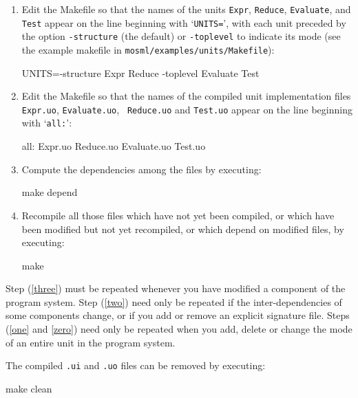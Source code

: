 \documentclass[fleqn,a4paper]{article}
\begin{document}
\begin{enumerate}
\item\label{zero} Edit the Makefile so that the names of the units
  {\tt Expr}, {\tt Reduce}, {\tt Evaluate},  and {\tt Test} appear on the line beginning
  with `{\tt UNITS=}', with each unit preceded by the option {\tt -structure} (the default) or
  {\tt -toplevel}
  to indicate its mode
  (see the example makefile in \texttt{mosml/examples/units/Makefile}):

\begin{program}
UNITS=-structure Expr Reduce -toplevel Evaluate Test
\end{program}

\item\label{one} Edit the Makefile so that the names of the compiled
  unit implementation files {\tt Expr.uo}, {\tt Evaluate.uo}, {\tt
    Reduce.uo} and {\tt Test.uo} appear on the line beginning with
  `{\tt all:}':

\begin{program}
all: Expr.uo Reduce.uo Evaluate.uo Test.uo
\end{program}

\item\label{two} Compute the dependencies among the files by executing:

\begin{program}
make depend
\end{program}

\item\label{three} Recompile all those files which have not yet been compiled, or
  which have been modified but not yet recompiled, or which depend on
  modified files, by executing:
        
\begin{program}
make    
\end{program}
\end{enumerate}

\noindent Step (\ref{three}) must be repeated whenever you have modified a
component of the program system.  Step (\ref{two}) need only be repeated if
the inter-dependencies of some components change, or if you add or
remove an explicit signature file.  Steps (\ref{one} and \ref{zero}) need only be repeated
when you add, delete or change the mode of an entire unit in the program system.

The compiled {\tt *.ui} and {\tt *.uo} files can be removed by executing:

\begin{program}
make clean  
\end{program}
\end{document}
